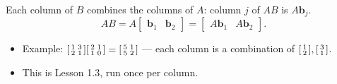 \documentclass[aspectratio=169, 11pt]{beamer}
\begin{document}
\begin{frame}[t, plain]
  Each column of $B$ combines the columns of $A$: column $j$ of $AB$ is $A\mathbf{b}_j$.
  \[
    AB = A\begin{bmatrix} \mathbf{b}_1 & \mathbf{b}_2 \end{bmatrix}
    = \begin{bmatrix} A\mathbf{b}_1 & A\mathbf{b}_2 \end{bmatrix}.
  \]
  \begin{itemize}
    \item Example: $\begin{bsmallmatrix} 1 & 3 \\ 2 & 1 \end{bsmallmatrix}\begin{bsmallmatrix} 2 & 1 \\ 1 & 0 \end{bsmallmatrix}
      =\begin{bsmallmatrix} 5 & 1 \\ 5 & 2 \end{bsmallmatrix}$ --- each column is a combination of $\begin{bsmallmatrix} 1\\2 \end{bsmallmatrix},\begin{bsmallmatrix} 3\\1 \end{bsmallmatrix}$.
    \item This is Lesson 1.3, run once per column.
  \end{itemize}
\end{frame}
\end{document}
